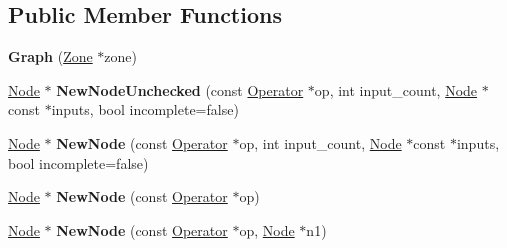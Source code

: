 \subsection*{Public Member Functions}
\begin{DoxyCompactItemize}
\item 
{\bfseries Graph} (\hyperlink{classv8_1_1internal_1_1_zone}{Zone} $\ast$zone)\hypertarget{classv8_1_1internal_1_1compiler_1_1_graph_ad50e52f7e457ee8d9ee48822e54dcff7}{}\label{classv8_1_1internal_1_1compiler_1_1_graph_ad50e52f7e457ee8d9ee48822e54dcff7}

\item 
\hyperlink{classv8_1_1internal_1_1compiler_1_1_node}{Node} $\ast$ {\bfseries New\+Node\+Unchecked} (const \hyperlink{classv8_1_1internal_1_1compiler_1_1_operator}{Operator} $\ast$op, int input\+\_\+count, \hyperlink{classv8_1_1internal_1_1compiler_1_1_node}{Node} $\ast$const $\ast$inputs, bool incomplete=false)\hypertarget{classv8_1_1internal_1_1compiler_1_1_graph_ac96b63d8f7e19cce02ab93f534e0ce27}{}\label{classv8_1_1internal_1_1compiler_1_1_graph_ac96b63d8f7e19cce02ab93f534e0ce27}

\item 
\hyperlink{classv8_1_1internal_1_1compiler_1_1_node}{Node} $\ast$ {\bfseries New\+Node} (const \hyperlink{classv8_1_1internal_1_1compiler_1_1_operator}{Operator} $\ast$op, int input\+\_\+count, \hyperlink{classv8_1_1internal_1_1compiler_1_1_node}{Node} $\ast$const $\ast$inputs, bool incomplete=false)\hypertarget{classv8_1_1internal_1_1compiler_1_1_graph_ad2588802d0525353a979dc8679f2a84e}{}\label{classv8_1_1internal_1_1compiler_1_1_graph_ad2588802d0525353a979dc8679f2a84e}

\item 
\hyperlink{classv8_1_1internal_1_1compiler_1_1_node}{Node} $\ast$ {\bfseries New\+Node} (const \hyperlink{classv8_1_1internal_1_1compiler_1_1_operator}{Operator} $\ast$op)\hypertarget{classv8_1_1internal_1_1compiler_1_1_graph_ac90dece42f8ffff6aba669fa22ea3f03}{}\label{classv8_1_1internal_1_1compiler_1_1_graph_ac90dece42f8ffff6aba669fa22ea3f03}

\item 
\hyperlink{classv8_1_1internal_1_1compiler_1_1_node}{Node} $\ast$ {\bfseries New\+Node} (const \hyperlink{classv8_1_1internal_1_1compiler_1_1_operator}{Operator} $\ast$op, \hyperlink{classv8_1_1internal_1_1compiler_1_1_node}{Node} $\ast$n1)\hypertarget{classv8_1_1internal_1_1compiler_1_1_graph_aaf262e1436574cd12a6a1c7571264655}{}\label{classv8_1_1internal_1_1compiler_1_1_graph_aaf262e1436574cd12a6a1c7571264655}


\end{DoxyCompactItemize}
